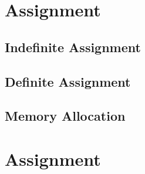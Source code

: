 \section{Assignment}

\subsection{Indefinite Assignment}

\subsection{Definite Assignment}

\subsection{Memory Allocation}

\section{Assignment}
